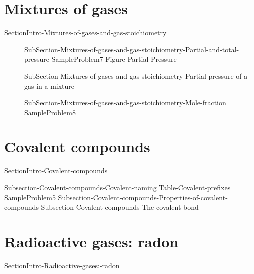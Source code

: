 \documentclass[main.tex]{subfiles}
\newcommand\chapterlabel{ChMIX-biomoleculesinsolution}\setcounter{figurenewcounter}{0}\setcounter{tablenewcounter}{0}\setcounter{formulanewcounter}{0}
\begin{document}
 \section{\faTint Mixtures of gases  }{SectionIntro-Mixtures-of-gases-and-gas-stoichiometry}
\sloppy 
\begin{description}
 \item[] 
{SubSection-Mixtures-of-gases-and-gas-stoichiometry-Partial-and-total-pressure}
{SampleProblem7}
 {Figure-Partial-Pressure}
\item[]  {SubSection-Mixtures-of-gases-and-gas-stoichiometry-Partial-pressure-of-a-gas-in-a-mixture}
\item[]  {SubSection-Mixtures-of-gases-and-gas-stoichiometry-Mole-fraction}
{SampleProblem8}
\end{description}





 



\renewcommand\chapterlabel{Ch-naming}
\section{\faEnvira Covalent compounds}
{SectionIntro-Covalent-compounds}
\sloppy \begin{description}
{Subsection-Covalent-compounds-Covalent-naming}
 {Table-Covalent-prefixes}	
{SampleProblem5}
{Subsection-Covalent-compounds-Properties-of-covalent-compounds}
{Subsection-Covalent-compounds-The-covalent-bond}
\end{description}



\renewcommand\chapterlabel{Ch-nuclear}
\section{\faFlash Radioactive gases: radon}
{SectionIntro-Radioactive-gases:-radon}
\end{document}
